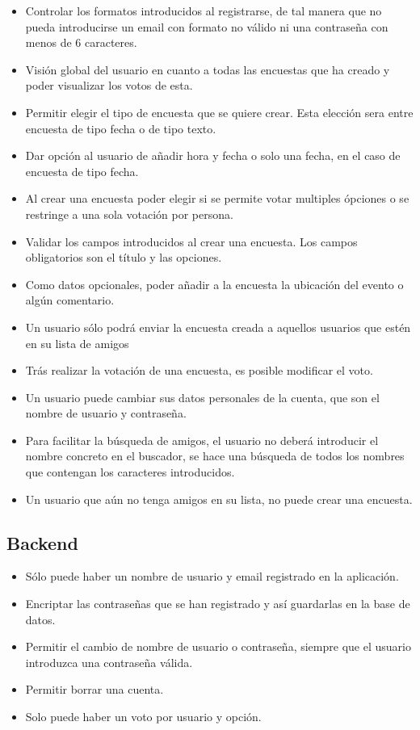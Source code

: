 \documentclass[a4paper, 12pt]{book}
\begin{document}
\begin{itemize}
 \item Controlar los formatos introducidos al registrarse, de tal manera que no pueda introducirse un email con formato no v\'alido ni una contrase\~na con menos de 6 caracteres.
 \item Visi\'on global del usuario en cuanto a todas las encuestas que ha creado y poder visualizar los votos de esta.
 \item Permitir elegir el tipo de encuesta que se quiere crear. Esta elecci\'on sera entre encuesta de tipo fecha o de tipo texto.
 \item Dar opci\'on al usuario de a\~nadir hora y fecha o solo una fecha, en el caso de encuesta de tipo fecha.
 \item Al crear una encuesta poder elegir si se permite votar multiples \'opciones o se restringe a una sola votaci\'on por persona.
 \item Validar los campos introducidos al crear una encuesta. Los campos obligatorios son el t\'itulo y las opciones.
 \item Como datos opcionales, poder a\~nadir a la encuesta la ubicaci\'on del evento o alg\'un comentario.
 \item Un usuario s\'olo podr\'a enviar la encuesta creada a aquellos usuarios que est\'en en su lista de amigos
 \item Tr\'as realizar la votaci\'on de una encuesta, es posible modificar el voto.
 \item Un usuario puede cambiar sus datos personales de la cuenta, que son el nombre de usuario y contrase\~na.
\item Para facilitar la b\'usqueda de amigos, el usuario no deber\'a introducir el nombre concreto en el buscador, se hace una b\'usqueda de todos los nombres que contengan los caracteres introducidos.
\item Un usuario que a\'un no tenga amigos en su lista, no puede crear una encuesta.
\end{itemize}

\subsection{Backend}
\label{sec:objetivos-especificos}




\begin{itemize}
 \item S\'olo puede haber un nombre de usuario y email registrado en la aplicaci\'on.
 \item Encriptar las contrase\~nas que se han registrado y as\'i guardarlas en la base de datos.
 \item Permitir el cambio de nombre de usuario o contrase\~na, siempre que el usuario introduzca una contrase\~na v\'alida.
 \item Permitir borrar una cuenta.
\item Solo puede haber un voto por usuario y opci\'on.
 
 

\end{itemize}
\end{document}
